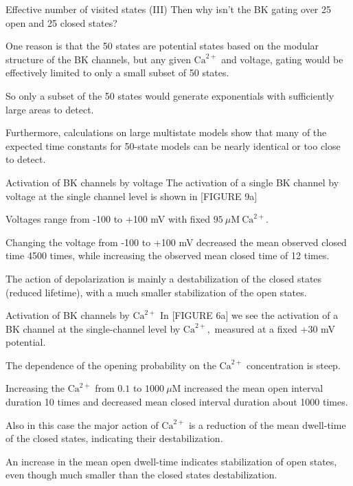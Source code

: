 \documentclass[t]{beamer}
\newcommand{\ca}{\text{Ca}^{2+}}
\begin{document}
\begin{frame}{Effective number of visited states (III)}
Then why isn't the BK gating over 25 open and 25 closed states?

One reason is that the 50 states are potential states based on the modular structure of the BK channels, but any given $\ca$ and voltage, gating would be effectively limited to only a small subset of 50 states.

So only a subset of the 50 states would generate exponentials with sufficiently large areas to detect.

Furthermore, calculations on large multistate models show that many of the expected time constants for 50-state models can be nearly identical or too close to detect.
\end{frame}

\begin{frame}{Activation of BK channels by voltage}
The activation of a single BK channel by voltage at the single channel level is shown in [FIGURE 9a]

Voltages range from -100 to +100 mV with fixed $95 \ \mu\text{M}\ \ca.$ 

Changing the voltage from -100 to +100 mV decreased the mean observed closed time 4500 times, while increasing the observed mean closed time of 12 times.

The action of depolarization is mainly a destabilization of the closed states (reduced lifetime), with a much smaller stabilization of the open states.
\end{frame}

\begin{frame}{Activation of BK channels by $\ca$}
In [FIGURE 6a] we see the activation of a BK channel at the single-channel level by $\ca,$ measured at a fixed +30 mV potential.

The dependence of the opening probability on the $\ca$ concentration is steep.

Increasing the $\ca$ from $0.1$ to $1000\ \mu\text{M}$ increased the mean open interval duration 10 times and decreased mean closed interval duration about 1000 times.

Also in this case the major action of $\ca$ is a reduction of the mean dwell-time of the closed states, indicating their destabilization.

An increase in the mean open dwell-time indicates stabilization of open states, even though much smaller than the closed states destabilization. 

\end{frame}
\end{document}

